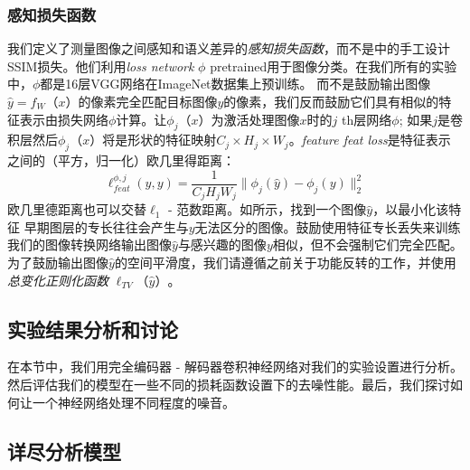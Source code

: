 \subsubsection{感知损失函数}

我们定义了测量图像之间感知和语义差异的\emph{感知损失函数}，而不是\cite{Zhao2015}中的手工设计SSIM损失。他们利用\emph{loss network} $ \phi $ pretrained用于图像分类。在我们所有的实验中，$ \phi $都是16层VGG网络\cite{Simonyan2014a}在ImageNet数据集\cite{Deng2009ImageNet}上预训练。
而不是鼓励输出图像$ \hat y = f_W（x）$的像素完全匹配目标图像$ y $的像素，我们反而鼓励它们具有相似的特征表示由损失网络$ \phi $计算。让$ \phi_j（x）$为激活处理图像$ x $时的$ j $ th层网络$ \phi $; 如果$ j $是卷积层然后$ \phi_j（x）$将是形状的特征映射$ C_j \times H_j \times W_j $。\emph {feature feat loss}是特征表示之间的（平方，归一化）欧几里得距离： 
\begin{equation}
  \ell_{feat}^{\phi,j}(\hat y, y) = 
  \frac1{C_jH_jW_j}\|\phi_j(\hat y) - \phi_j(y)\|_2^2
\end{equation}
欧几里德距离也可以交替$ \ell_{1} $ - 范数距离。如\cite{Mahendran2015}所示，找到一个图像$ \hat y $，以最小化该特征
早期图层的专长往往会产生与$ y $无法区分的图像。鼓励使用特征专长丢失来训练我们的图像转换网络输出图像$ \hat y $与感兴趣的图像$ y $相似，但不会强制它们完全匹配。为了鼓励输出图像$ \hat y $的空间平滑度，我们请遵循之前关于功能反转\cite{Mahendran2015}的工作，并使用\emph {总变化正则化函数} $ \ell_{TV}（\hat y）$。
 
\subsection{实验结果分析和讨论}
\label{sec:experiments-results}

在本节中，我们用完全编码器 - 解码器卷积神经网络对我们的实验设置进行分析。然后评估我们的模型在一些不同的损耗函数设置下的去噪性能。最后，我们探讨如何让一个神经网络处理不同程度的噪音。
\subsection{详尽分析模型}

